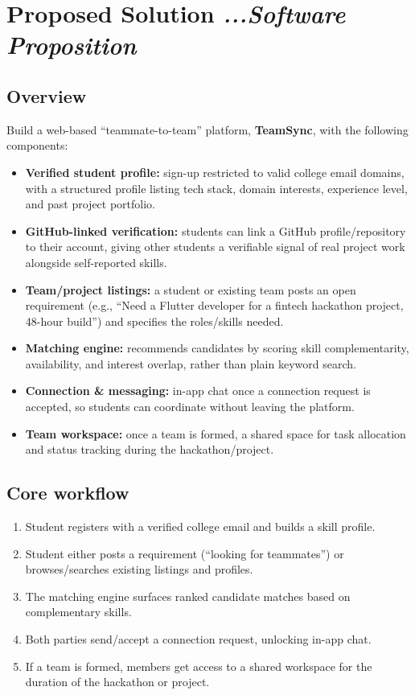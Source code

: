 \documentclass[11pt]{article}
\begin{document}
\section{Proposed Solution \textit{...Software Proposition}}
\subsection{Overview}
Build a web-based ``teammate-to-team'' platform, \textbf{TeamSync}, with the following
components:
\begin{itemize}[leftmargin=*]
  \item \textbf{Verified student profile:} sign-up restricted to valid college email domains,
  with a structured profile listing tech stack, domain interests, experience level, and past
  project portfolio.
  \item \textbf{GitHub-linked verification:} students can link a GitHub profile/repository to
  their account, giving other students a verifiable signal of real project work alongside
  self-reported skills.
  \item \textbf{Team/project listings:} a student or existing team posts an open requirement
  (e.g., ``Need a Flutter developer for a fintech hackathon project, 48-hour build'') and
  specifies the roles/skills needed.
  \item \textbf{Matching engine:} recommends candidates by scoring skill complementarity,
  availability, and interest overlap, rather than plain keyword search.
  \item \textbf{Connection \& messaging:} in-app chat once a connection request is accepted, so
  students can coordinate without leaving the platform.
  \item \textbf{Team workspace:} once a team is formed, a shared space for task allocation and
  status tracking during the hackathon/project.
\end{itemize}

\subsection{Core workflow}
\begin{enumerate}[leftmargin=*]
  \item Student registers with a verified college email and builds a skill profile.
  \item Student either posts a requirement (``looking for teammates'') or browses/searches
  existing listings and profiles.
  \item The matching engine surfaces ranked candidate matches based on complementary skills.
  \item Both parties send/accept a connection request, unlocking in-app chat.
  \item If a team is formed, members get access to a shared workspace for the duration of the
  hackathon or project.
\end{enumerate}
\end{document}
